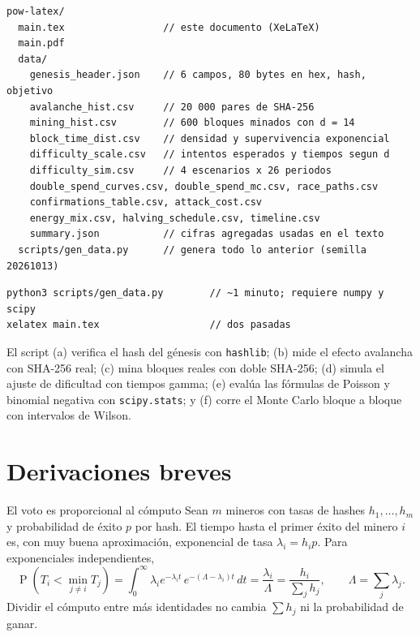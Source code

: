 \documentclass[11pt,a4paper]{article}
\newcommand{\Prob}[1]{\operatorname{P}\!\left(#1\right)}
\newcommand{\webhint}[1]{}
\begin{document}
\begin{lstlisting}[language=pseudo]
pow-latex/
  main.tex                 // este documento (XeLaTeX)
  main.pdf
  data/
    genesis_header.json    // 6 campos, 80 bytes en hex, hash, objetivo
    avalanche_hist.csv     // 20 000 pares de SHA-256
    mining_hist.csv        // 600 bloques minados con d = 14
    block_time_dist.csv    // densidad y supervivencia exponencial
    difficulty_scale.csv   // intentos esperados y tiempos segun d
    difficulty_sim.csv     // 4 escenarios x 26 periodos
    double_spend_curves.csv, double_spend_mc.csv, race_paths.csv
    confirmations_table.csv, attack_cost.csv
    energy_mix.csv, halving_schedule.csv, timeline.csv
    summary.json           // cifras agregadas usadas en el texto
  scripts/gen_data.py      // genera todo lo anterior (semilla 20261013)
\end{lstlisting}

\begin{lstlisting}[language=pseudo]
python3 scripts/gen_data.py        // ~1 minuto; requiere numpy y scipy
xelatex main.tex                   // dos pasadas
\end{lstlisting}

El script (a) verifica el hash del génesis con \texttt{hashlib}; (b) mide el efecto avalancha con SHA-256 real; (c) mina bloques reales con doble SHA-256; (d) simula el ajuste de dificultad con tiempos gamma; (e) evalúa las fórmulas de Poisson y binomial negativa con \texttt{scipy.stats}; y (f) corre el Monte Carlo bloque a bloque con intervalos de Wilson.

\section{Derivaciones breves}\label{app:deriv}
\webhint{section; id=app-deriv; slug=derivaciones; kicker=apéndice; role=math}

\begin{resultado}{El voto es proporcional al cómputo}\label{der:proporcional}
Sean $m$ mineros con tasas de hashes $h_1,\dots,h_m$ y probabilidad de éxito $p$ por hash. El tiempo hasta el primer éxito del minero $i$ es, con muy buena aproximación, exponencial de tasa $\lambda_i=h_ip$. Para exponenciales independientes,
\[
  \Prob{T_i<\min_{j\ne i}T_j}=\int_0^{\infty}\lambda_ie^{-\lambda_it}\,e^{-(\Lambda-\lambda_i)t}\,dt=\frac{\lambda_i}{\Lambda}=\frac{h_i}{\sum_jh_j},\qquad \Lambda=\sum_j\lambda_j .
\]
Dividir el cómputo entre más identidades no cambia $\sum h_j$ ni la probabilidad de ganar.
\end{resultado}
\end{document}
